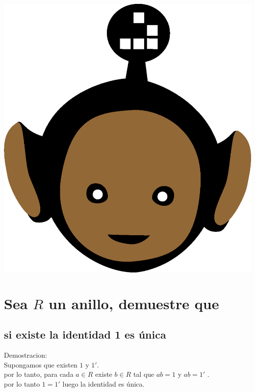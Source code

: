 \documentclass[10pt,a4paper]{article} %
\begin{document}
    \title{\rmfamily\normalfont{}}
    \author{}
    \date{\today}

    \maketitle


    \includegraphics[width=0.1\linewidth]{negro_cara.png}
    \section{Sea $ R  $ un anillo, demuestre que }
        \subsection{si existe la identidad 1 es única}
         Demostracion:
         \\ Supongamos que existen $ 1  $  y $ 1'  $.
         \\ por lo tanto, para cada $ a \in  R   $ existe $ b \in R  $ tal que
         $ ab = 1  $  y $ ab = 1'  $ .
         \\por lo tanto $ 1 = 1'  $ luego la identidad es única.
\end{document}
